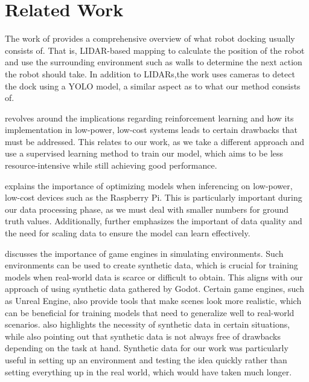 \section{Related Work}
The work of \citet{app131910675} provides a comprehensive overview of what robot docking usually consists of. That is, LIDAR-based mapping to calculate the position of the robot and use the surrounding environment such as walls to determine the next action the robot should take. In addition to LIDARs,the work uses cameras to detect the dock using a YOLO model, a similar aspect as to what our method consists of.

\citet{Deisenroth2012} revolves around the implications regarding reinforcement learning and how its implementation in low-power, low-cost systems leads to certain drawbacks that must be addressed. This relates to our work, as we take a different approach and use a supervised learning method to train our model, which aims to be less resource-intensive while still achieving good performance.

\citet{ameen2023optimizingdeeplearningmodels} explains the importance of optimizing models when inferencing on low-power, low-cost devices such as the Raspberry Pi. This is particularly important during our data processing phase, as we must deal with smaller numbers for ground truth values. Additionally, \citet{SINGH2020105524} further emphasizes the important of data quality and the need for scaling data to ensure the model can learn effectively.

\citet{hoster2024usinggameenginesmachine} discusses the importance of game engines in simulating environments. Such environments can be used to create synthetic data, which is crucial for training models when real-world data is scarce or difficult to obtain. This aligns with our approach of using synthetic data gathered by Godot. Certain game engines, such as Unreal Engine, also provide tools that make scenes look more realistic, which can be beneficial for training models that need to generalize well to real-world scenarios. \citet{depth_anything_v2} also highlights the necessity of synthetic data in certain situations, while also pointing out that synthetic data is not always free of drawbacks depending on the task at hand. Synthetic data for our work was particularly useful in setting up an environment and testing the idea quickly rather than setting everything up in the real world, which would have taken much longer.

